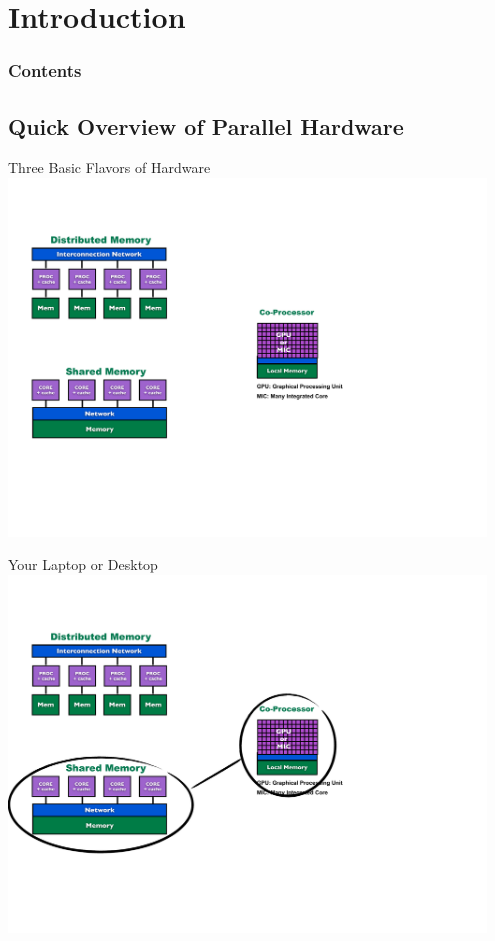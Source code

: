 \section{Introduction}

\hidenum
\begin{frame}[noframenumbering]
\frametitle{Contents}
 \tableofcontents[currentsection,hideothersubsections,sectionstyle=show/hide]
\end{frame}
\shownum

\subsection{Quick Overview of Parallel Hardware}

\begin{frame}
\begin{block}{Three Basic Flavors of Hardware}
    \includegraphics[width=0.95\textwidth]{pics/ParallelHardware1.pdf}
\end{block}
\end{frame}

\begin{frame}
\begin{block}{Your Laptop or Desktop}
    \includegraphics[width=0.95\textwidth]{pics/ParallelHardware2.pdf}
\end{block}
\end{frame}

